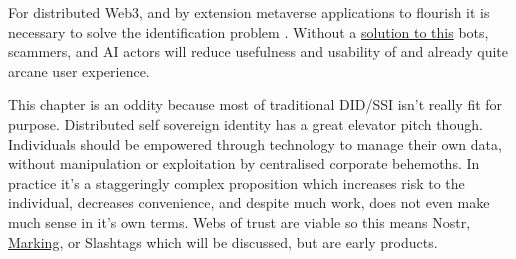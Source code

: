 For distributed Web3, and by extension metaverse applications to flourish it is necessary to solve the identification problem \cite{king1966fisher}. Without a \href{https://joshgans.medium.com/web3-isnt-going-to-work-without-identification-6aa776d674}{solution to this} bots, scammers, and AI actors will reduce usefulness and usability of and already quite arcane user experience.\par  
This chapter is an oddity because most of traditional DID/SSI isn't really fit for purpose. Distributed self sovereign identity has a great elevator pitch though. Individuals should be empowered through technology to manage their own data, without manipulation or exploitation by centralised corporate behemoths. In practice it's a staggeringly complex proposition which increases risk to the individual, decreases convenience, and despite much work, does not even make much sense in it's own terms. Webs of trust are viable so this means Nostr, \href{https://github.com/project-bitmark/marking/wiki#marking}{Marking}, or Slashtags which will be discussed, but are early products. %

